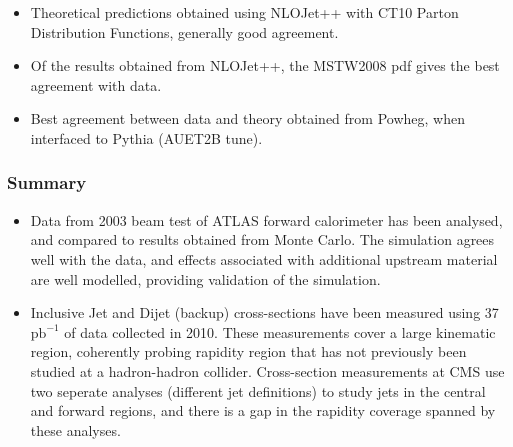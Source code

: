 \documentclass[10pt]{beamer}
\begin{document}
\begin{frame}
\begin{columns}
\end{columns}
\begin{itemize}
\item Theoretical predictions obtained using NLOJet++ with CT10 Parton Distribution Functions, generally good agreement.
\item Of the results obtained from NLOJet++, the MSTW2008 pdf gives the best agreement with data.
\item Best agreement between data and theory obtained from Powheg, when interfaced to Pythia (AUET2B tune).
\end{itemize}
\end{frame}
%
\begin{frame}\frametitle{Summary}
\begin{itemize}
\item Data from 2003 beam test of ATLAS forward calorimeter has been analysed, and compared to results obtained from Monte Carlo. The simulation agrees well with the data, and effects associated with additional upstream material are well modelled, providing validation of the simulation.  %
\item Inclusive Jet and Dijet (backup) cross-sections have been measured using 37 $\mathrm{pb}^{-1}$ of data collected in 2010. These measurements cover a large kinematic region, coherently probing rapidity region that has not previously been studied at a hadron-hadron collider. Cross-section measurements at CMS use two seperate analyses (different jet definitions) to study jets in the central and forward regions, and there is a gap in the rapidity coverage spanned by these analyses.
\end{itemize}
\end{frame}
\end{document}
